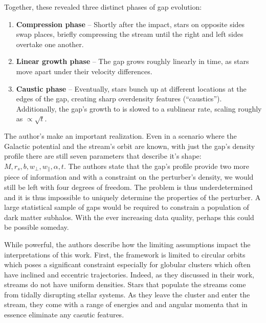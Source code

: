             Together, these revealed three distinct phases of gap evolution:
            \begin{enumerate}
                \item \textbf{Compression phase} --  Shortly after the impact, stars on opposite sides swap places, briefly compressing the stream until the right and left sides overtake one another. 
                \item \textbf{Linear growth phase} -- The gap grows roughly linearly in time, as stars move apart under their velocity differences.
                \item \textbf{Caustic phase} -- Eventually, stars bunch up at different locations at the edges of the gap, creating sharp overdensity features (``caustics''). Additionally, the gap's growth to is slowed to a sublinear rate, scaling roughly as $\propto \sqrt{t}$.
            \end{enumerate}


            The author's make an important realization. Even in a scenario where the Galactic potential and the stream's orbit are known, with just the gap's density profile there are still seven parameters that describe it's shape: $M,r_s,b,w_\perp,w_\parallel,\alpha,t$. The authors state that the gap's profile provide two more piece of information and with a constraint on the perturber's density, we would still be left with four degrees of freedom. The problem is thus underdetermined and it is thus impossible to uniquely determine the properties of the perturber. A large statistical sample of gaps would be required to constrain a population of dark matter subhalos. With the ever increasing data quality, perhaps this could be possible someday.  

            While powerful, the authors describe how the limiting assumptions impact the interpretations of this work. First, the framework is limited to circular orbits which poses a significant constraint especially for globular clusters which often have inclined and eccentric trajectories. Indeed, as they discussed in their work, streams do not have uniform densities. Stars that populate the streams come from tidally disrupting stellar systems. As they leave the cluster and enter the stream, they come with a range of energies and and angular momenta that in essence eliminate any casutic features. 

